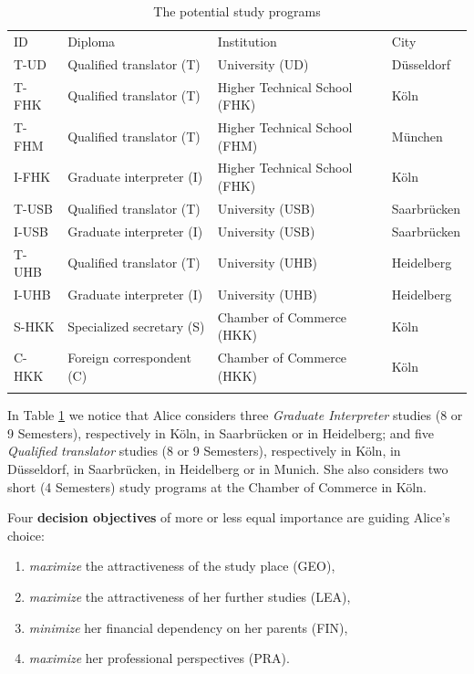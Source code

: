 \begin{table}[h]
\caption{The potential study programs}
\label{tab:12.1}       %
\begin{center}
    \begin{tabular}{l|l|l|l}
      \hline\noalign{\smallskip}
      ID & Diploma & Institution & City\\
      \noalign{\smallskip}\hline\noalign{\smallskip}
      T-UD   & Qualified translator (T)  &   University (UD)               &  Düsseldorf\\
      T-FHK  & Qualified translator (T)  &   Higher Technical School (FHK) &  Köln\\
      T-FHM  & Qualified translator (T)  &   Higher Technical School (FHM) &  München\\
      I-FHK  & Graduate interpreter (I)  &   Higher Technical School (FHK) &  Köln\\
      T-USB  & Qualified translator (T)  &   University (USB)              &  Saarbrücken\\
      I-USB  & Graduate interpreter (I)  &   University (USB)              &  Saarbrücken\\
      T-UHB  & Qualified translator (T)  &   University (UHB)              &  Heidelberg\\
      I-UHB  & Graduate interpreter (I)  &   University (UHB)              &  Heidelberg\\
      S-HKK  & Specialized secretary (S) &   Chamber of Commerce (HKK)     &  Köln\\
      C-HKK  & Foreign correspondent (C) &   Chamber of Commerce (HKK)     &  Köln\\
      \noalign{\smallskip}\hline
    \end{tabular}
\end{center}
\end{table}

In Table \ref{tab:12.1} we notice that Alice considers three \emph{Graduate Interpreter} studies (8 or 9 Semesters), respectively in Köln, in Saarbrücken or in Heidelberg; and five \emph{Qualified translator} studies (8 or 9 Semesters), respectively in Köln, in Düsseldorf, in Saarbrücken, in Heidelberg or in Munich. She also considers two short (4 Semesters) study programs at the Chamber of Commerce in Köln. 

Four \textbf{decision objectives} of more or less equal importance are guiding Alice's choice:
\begin{enumerate}
\item \emph{maximize} the attractiveness of the study place (GEO),
\item \emph{maximize} the attractiveness of her further studies (LEA),
\item \emph{minimize}  her financial dependency on her parents (FIN),
\item \emph{maximize} her professional perspectives (PRA).
\end{enumerate}

